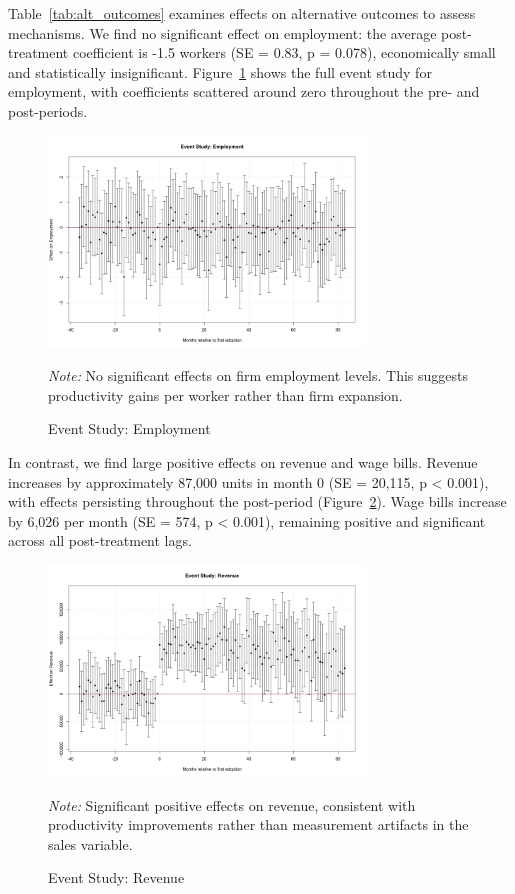 \documentclass{article}
\begin{document}
Table~\ref{tab:alt_outcomes} examines effects on alternative outcomes to assess mechanisms. We find no significant effect on employment: the average post-treatment coefficient is -1.5 workers (SE = 0.83, p = 0.078), economically small and statistically insignificant. Figure~\ref{fig:es_employment} shows the full event study for employment, with coefficients scattered around zero throughout the pre- and post-periods.

\begin{figure}[htbp]
\centering
\includegraphics[width=0.75\textwidth]{es_employment.png}
\caption{Event Study: Employment}
\label{fig:es_employment}
\vspace{-0.5em}
{\small \textit{Note:} No significant effects on firm employment levels. This suggests productivity gains per worker rather than firm expansion.}
\end{figure}

In contrast, we find large positive effects on revenue and wage bills. Revenue increases by approximately 87,000 units in month 0 (SE = 20,115, p < 0.001), with effects persisting throughout the post-period (Figure~\ref{fig:es_revenue}). Wage bills increase by 6,026 per month (SE = 574, p < 0.001), remaining positive and significant across all post-treatment lags.

\begin{figure}[htbp]
\centering
\includegraphics[width=0.75\textwidth]{es_revenue.png}
\caption{Event Study: Revenue}
\label{fig:es_revenue}
\vspace{-0.5em}
{\small \textit{Note:} Significant positive effects on revenue, consistent with productivity improvements rather than measurement artifacts in the sales variable.}
\end{figure}
\end{document}
